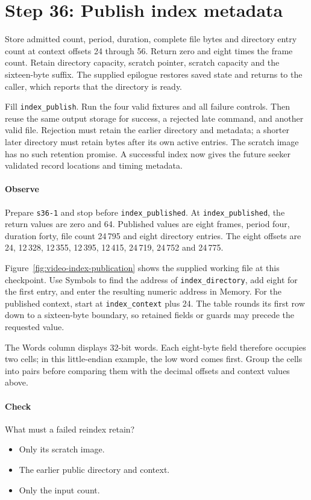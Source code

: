 \section{Step 36: Publish index metadata}
Store admitted count, period, duration, complete file bytes and directory
entry count at context offsets 24 through 56. Return zero and eight times the
frame count. Retain directory capacity, scratch pointer, scratch capacity and
the sixteen-byte suffix. The supplied epilogue restores saved state and returns
to the caller, which reports that the directory is ready.

Fill \texttt{index\_publish}. Run the four valid fixtures and all failure
controls. Then reuse the same output storage for success, a rejected late command,
and another valid file. Rejection must retain the earlier directory and metadata;
a shorter later directory must retain bytes after its own active entries. The
scratch image has no such retention promise. A successful index now gives the
future seeker validated record locations and timing metadata.

\paragraph{Observe} Prepare \texttt{s36-1} and stop before
\texttt{index\_published}. At \texttt{index\_published}, the return values are zero and
64. Published values are eight frames, period four, duration forty, file count
24\,795 and eight directory entries. The eight offsets are 24, 12\,328,
12\,355, 12\,395, 12\,415, 24\,719, 24\,752 and 24\,775.

Figure~\ref{fig:video-index-publication} shows the supplied working file at this checkpoint. Use Symbols to find the address of \texttt{index\_directory}, add eight for the first entry, and enter the resulting numeric address in Memory. For the published context, start at \texttt{index\_context} plus 24. The table rounds its first row down to a sixteen-byte boundary, so retained fields or guards may precede the requested value.

The Words column displays 32-bit words. Each eight-byte field therefore occupies two cells; in this little-endian example, the low word comes first. Group the cells into pairs before comparing them with the decimal offsets and context values above.


\clearpage

\paragraph{Check} What must a failed reindex retain?
\begin{itemize}
  \item[A.] Only its scratch image.
  \item[B.] The earlier public directory and context.
  \item[C.] Only the input count.
\end{itemize}
